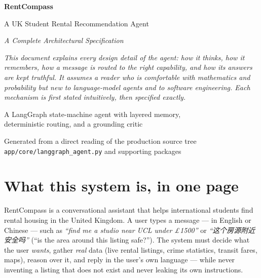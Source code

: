 \documentclass[11pt,a4paper]{article}
\newcommand{\code}[1]{\texttt{\small #1}}
\begin{document}
\begin{titlepage}
\centering
\vspace*{2cm}
{\Huge\bfseries\color{accent} RentCompass\par}
\vspace{0.6cm}
{\LARGE A UK Student Rental Recommendation Agent\par}
\vspace{0.4cm}
{\large\itshape A Complete Architectural Specification\par}
\vspace{2cm}
\begin{tcolorbox}[colback=soft,colframe=accent,width=0.85\textwidth,arc=3pt]
\centering\itshape
This document explains \emph{every} design detail of the agent: how it thinks,
how it remembers, how a message is routed to the right capability, and how its
answers are kept truthful. It assumes a reader who is comfortable with
mathematics and probability but new to language-model agents and to software
engineering. Each mechanism is first stated intuitively, then specified exactly.
\end{tcolorbox}
\vspace{2cm}

{\large A LangGraph state-machine agent with layered memory,\\ deterministic routing, and a grounding critic\par}
\vfill
{\small Generated from a direct reading of the production source tree\\
\code{app/core/langgraph\_agent.py} and supporting packages\par}
\end{titlepage}

\tableofcontents
\newpage

\section{What this system is, in one page}
\label{sec:overview}

RentCompass is a conversational assistant that helps international students find
rental housing in the United Kingdom. A user types a message --- in English or
Chinese --- such as \emph{``find me a studio near UCL under \pounds1500''} or
\emph{``这个房源附近安全吗''} (``is the area around this
listing safe?''). The system must decide what the user \emph{wants}, gather
\emph{real} data (live rental listings, crime statistics, transit fares, maps),
reason over it, and reply in the user's own language --- while never inventing a
listing that does not exist and never leaking its own instructions.
\end{document}
